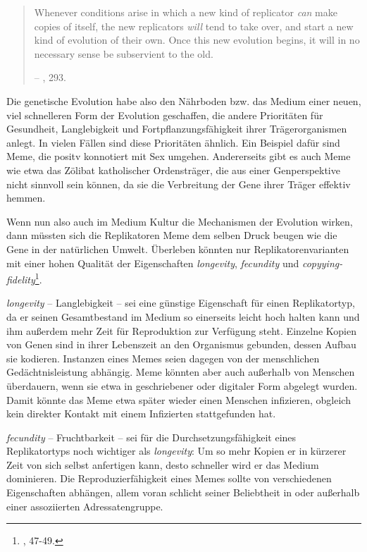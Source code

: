 \documentclass[openany,twoside,twocolumn]{book}
\let\rmarkdownfootnote\footnote%
\def\footnote{\protect\rmarkdownfootnote}
\begin{document}
\begin{quote}
Whenever conditions arise in which a new kind of replicator \emph{can}
make copies of itself, the new replicators \emph{will} tend to take
over, and start a new kind of evolution of their own. Once this new
evolution begins, it will in no necessary sense be subservient to the
old.

-- \textcite{Dawkinsselfishgene40th2016}, 293.
\end{quote}

Die genetische Evolution habe also den Nährboden bzw. das Medium einer
neuen, viel schnelleren Form der Evolution geschaffen, die andere
Prioritäten für Gesundheit, Langlebigkeit und Fortpflanzungsfähigkeit
ihrer Trägerorganismen anlegt. In vielen Fällen sind diese Prioritäten
ähnlich. Ein Beispiel dafür sind Meme, die positv konnotiert mit Sex
umgehen. Andererseits gibt es auch Meme wie etwa das Zölibat
katholischer Ordensträger, die aus einer Genperspektive nicht sinnvoll
sein können, da sie die Verbreitung der Gene ihrer Träger effektiv
hemmen.

Wenn nun also auch im Medium Kultur die Mechanismen der Evolution
wirken, dann müssten sich die Replikatoren Meme dem selben Druck beugen
wie die Gene in der natürlichen Umwelt. Überleben könnten nur
Replikatorenvarianten mit einer hohen Qualität der Eigenschaften
\emph{longevity}, \emph{fecundity} und
\emph{copyying-fidelity}\footnote{\textcite{Dawkinsselfishgene40th2016},
  47-49.}.

\emph{longevity} -- Langlebigkeit -- sei eine günstige Eigenschaft für
einen Replikatortyp, da er seinen Gesamtbestand im Medium so einerseits
leicht hoch halten kann und ihm außerdem mehr Zeit für Reproduktion zur
Verfügung steht. Einzelne Kopien von Genen sind in ihrer Lebenszeit an
den Organismus gebunden, dessen Aufbau sie kodieren. Instanzen eines
Memes seien dagegen von der menschlichen Gedächtnisleistung abhängig.
Meme könnten aber auch außerhalb von Menschen überdauern, wenn sie etwa
in geschriebener oder digitaler Form abgelegt wurden. Damit könnte das
Meme etwa später wieder einen Menschen infizieren, obgleich kein
direkter Kontakt mit einem Infizierten stattgefunden hat.

\emph{fecundity} -- Fruchtbarkeit -- sei für die Durchsetzungsfähigkeit
eines Replikatortyps noch wichtiger als \emph{longevity}: Um so mehr
Kopien er in kürzerer Zeit von sich selbst anfertigen kann, desto
schneller wird er das Medium dominieren. Die Reproduzierfähigkeit eines
Memes sollte von verschiedenen Eigenschaften abhängen, allem voran
schlicht seiner Beliebtheit in oder außerhalb einer assoziierten
Adressatengruppe.
\end{document}

